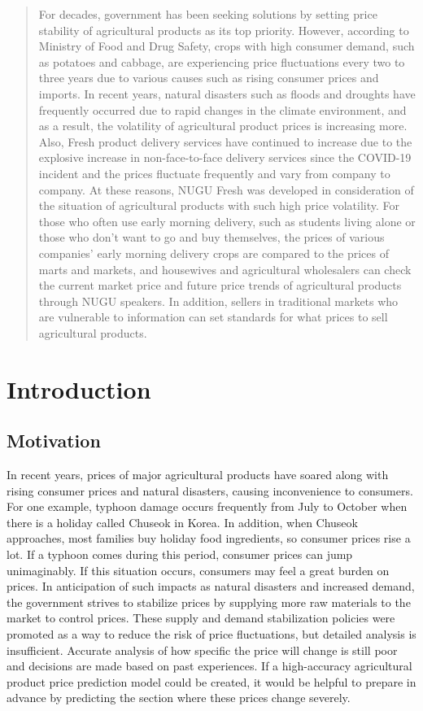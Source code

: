 \documentclass[conference]{IEEEtran}
\begin{document}
\begin{abstract}
For decades, government has been seeking solutions by setting price stability of agricultural products as its top priority. However, according to Ministry of Food and Drug Safety, crops with high consumer demand, such as potatoes and cabbage, are experiencing price fluctuations every two to three years due to various causes such as rising consumer prices and imports. In recent years, natural disasters such as floods and droughts have frequently occurred due to rapid changes in the climate environment, and as a result, the volatility of agricultural product prices is increasing more. Also, Fresh product delivery services have continued to increase due to the explosive increase in non-face-to-face delivery services since the COVID-19 incident and the prices fluctuate frequently and vary from company to company. At these reasons, NUGU Fresh was developed in consideration of the situation of agricultural products with such high price volatility. For those who often use early morning delivery, such as students living alone or those who don’t want to go and buy themselves, the prices of various companies’ early morning delivery crops are compared to the prices of marts and markets, and housewives and agricultural wholesalers can check the current market price and future price trends of agricultural products through NUGU speakers. In addition, sellers in traditional markets who are vulnerable to information can set standards for what prices to sell agricultural products.
\end{abstract}

\section{Introduction}
\subsection{Motivation}
In recent years, prices of major agricultural products have soared along with rising consumer prices and natural disasters, causing inconvenience to consumers. For one example, typhoon damage occurs frequently from July to October when there is a holiday called Chuseok in Korea. In addition, when Chuseok approaches, most families buy holiday food ingredients, so consumer prices rise a lot. If a typhoon comes during this period, consumer prices can jump unimaginably. If this situation occurs, consumers may feel a great burden on prices. In anticipation of such impacts as natural disasters and increased demand, the government strives to stabilize prices by supplying more raw materials to the market to control prices. These supply and demand stabilization policies were promoted as a way to reduce the risk of price fluctuations, but detailed analysis is insufficient. Accurate analysis of how specific the price will change is still poor and decisions are made based on past experiences. If a high-accuracy agricultural product price prediction model could be created, it would be helpful to prepare in advance by predicting the section where these prices change severely.
\end{document}

